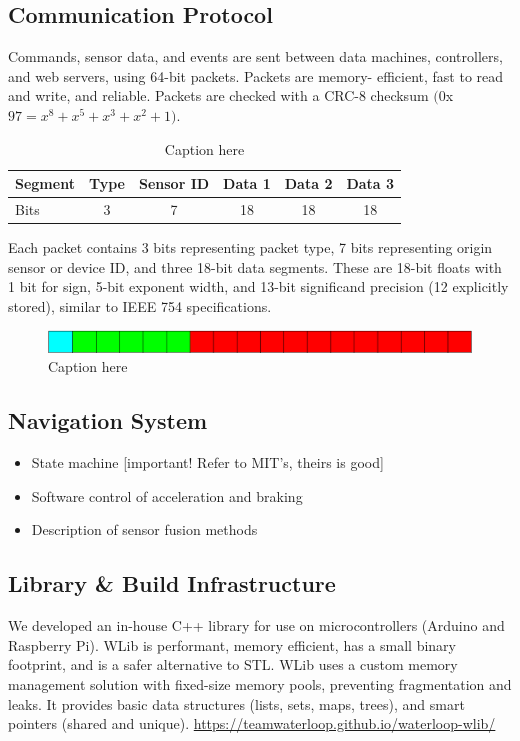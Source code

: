 \documentclass[main.tex]{subfiles}
\begin{document}
    \subsection{Communication Protocol}
    Commands, sensor data, and events are sent between data machines, controllers, and web servers, using 64-bit packets. Packets are memory-		efficient, fast to read and write, and reliable. Packets are checked with a CRC-8 checksum $(0$x$97 = x^8 + x^5 + x^3 + x^2 + 1)$.
    \begin{table}[H]
    	\centering
    	\begin{tabular}{@{}lccccc@{}} \toprule
            Segment & Type & Sensor ID & Data 1 & Data 2 & Data 3 \\ \midrule
            Bits & 3 & 7 & 18 & 18 & 18 \\ \bottomrule
        \end{tabular}
        \caption{Caption here}
    \end{table}
    Each packet contains 3 bits representing packet type, 7 bits representing origin sensor or device ID, and three 18-bit data segments. These are 18-bit floats with 1 bit for sign, 5-bit exponent width, and 13-bit significand precision (12 explicitly stored), similar to IEEE 754 specifications.
	\begin{figure}[H]
        \centering
        \includegraphics[width = \textwidth]{images/fig326}
    	\caption{Caption here}
    \end{figure}
    \subsection{Navigation System}
    \begin{itemize}
        \item State machine [important! Refer to MIT’s, theirs is good]
        \item Software control of acceleration and braking
        \item Description of sensor fusion methods
    \end{itemize}
    \subsection{Library \& Build Infrastructure}
    We developed an in-house C++ library for use on microcontrollers (Arduino and Raspberry Pi). WLib is performant, memory efficient, has a small binary footprint, and is a safer alternative to STL. WLib uses a custom memory management solution with fixed-size memory pools, preventing fragmentation and leaks. It provides basic data structures (lists, sets, maps, trees), and smart pointers (shared and unique).
    \url{https://teamwaterloop.github.io/waterloop-wlib/}
\end{document}
